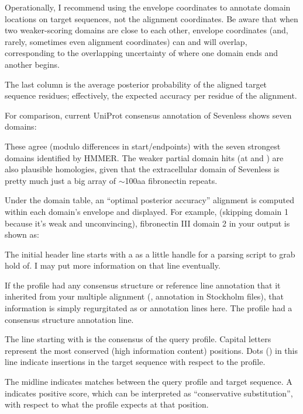 Operationally, I recommend using the envelope coordinates to annotate
domain locations on target sequences, not the alignment
coordinates. Be aware that when two weaker-scoring domains are close
to each other, envelope coordinates (and, rarely, sometimes even
alignment coordinates) can and will overlap, corresponding to the
overlapping uncertainty of where one domain ends and another begins.

The last column is the average posterior probability of the aligned
target sequence residues; effectively, the expected accuracy per
residue of the alignment.

For comparison, current UniProt consensus annotation of Sevenless
shows seven domains:


These agree (modulo differences in start/endpoints) with the seven
strongest domains identified by HMMER. The weaker partial domain hits
(at \SFSacoords{} and \SFSbcoords{}) are also plausible homologies, given that
the extracellular domain of Sevenless is pretty much just a big array
of $\sim$100aa fibronectin repeats.

Under the domain table, an ``optimal posterior accuracy''
alignment\cite{Holmes98} is computed within each domain's envelope
and displayed. For example, (skipping domain 1 because it's weak and
unconvincing), fibronectin III domain 2 in your 
output is shown as:


The initial header line starts with a \mono{==} as a little handle for
a parsing script to grab hold of. I may put more information on that line
eventually.

If the profile had any consensus structure or reference line annotation
that it inherited from your multiple alignment (,
 annotation in Stockholm files), that information is
simply regurgitated as  or  annotation lines
here. The  profile had a consensus structure annotation line.

The line starting with  is the consensus of the query
profile. Capital letters represent the most conserved (high information
content) positions. Dots () in this line indicate insertions
in the target sequence with respect to the profile.

The midline indicates matches between the query profile and target
sequence. A \mono{+} indicates positive score, which can be
interpreted as ``conservative substitution'', with respect to what the
profile expects at that position.

